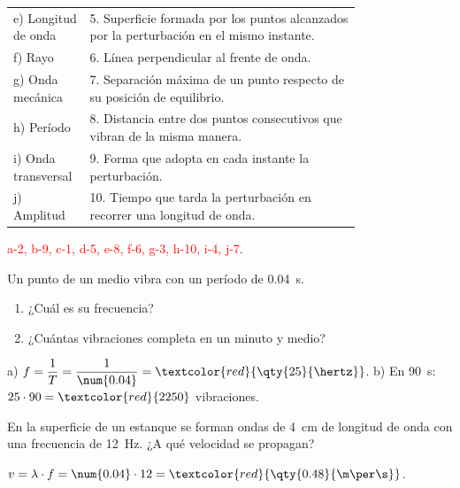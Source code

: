 \begin{exercise}
\begin{center}
{\begin{tabular}{@{}l p{0.78\linewidth}@{}}
            e) Longitud de onda & 5. Superficie formada por los puntos alcanzados por la perturbación en el mismo instante. \\[3pt]
            f) Rayo & 6. Línea perpendicular al frente de onda. \\[3pt]
            g) Onda mecánica & 7. Separación máxima de un punto respecto de su posición de equilibrio. \\[3pt]
            h) Período & 8. Distancia entre dos puntos consecutivos que vibran de la misma manera. \\[3pt]
            i) Onda transversal & 9. Forma que adopta en cada instante la perturbación. \\[3pt]
            j) Amplitud & 10. Tiempo que tarda la perturbación en recorrer una longitud de onda. \\
            \bottomrule
        \end{tabular}
        }
    \end{center}
    \begin{solu}
        \textcolor{red}{a-2, b-9, c-1, d-5, e-8, f-6, g-3, h-10, i-4, j-7}.
    \end{solu}
\end{exercise}

\begin{exercise}
    Un punto de un medio vibra con un período de \qty{0.04}{\s}.
    \begin{enumerate}[label=\alph*)]
        \item ¿Cuál es su frecuencia?
        \item ¿Cuántas vibraciones completa en un minuto y medio?
    \end{enumerate}
    \begin{solu}
        a) \(f = \dfrac{1}{T} = \dfrac{1}{\num{0.04}} = \textcolor{red}{\qty{25}{\hertz}}\).
        b) En \qty{90}{\s}: \(25 \cdot 90 = \textcolor{red}{2250}\) vibraciones.
    \end{solu}
\end{exercise}

\begin{exercise}
    En la superficie de un estanque se forman ondas de \qty{4}{\cm} de longitud de onda con una frecuencia de \qty{12}{\hertz}. ¿A qué velocidad se propagan?
    \begin{solu}
        \(v = \lambda \cdot f = \num{0.04} \cdot 12 = \textcolor{red}{\qty{0.48}{\m\per\s}}\).
    \end{solu}
\end{exercise}

